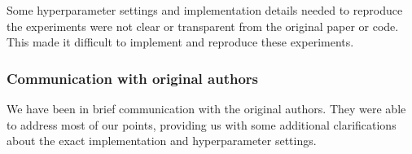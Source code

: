 Some hyperparameter settings and implementation details needed to reproduce the experiments were not clear or transparent from the original paper or code. This made it difficult to implement and reproduce these experiments.

\subsubsection*{Communication with original authors}

We have been in brief communication with the original authors. They were able to address most of our points, providing us with some additional clarifications about the exact implementation and hyperparameter settings.
